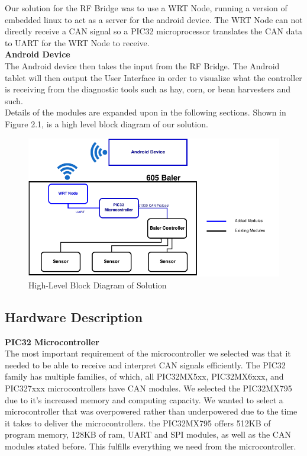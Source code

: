 \documentclass[paper=a4, fontsize=11pt]{scrartcl}
\numberwithin{equation}{section}		%
\numberwithin{figure}{section}			%
\numberwithin{table}{section}				%
\begin{document}
Our solution for the RF Bridge was to use a WRT Node, running a version of embedded linux to act as a server for the android device. The WRT Node can not directly receive a CAN signal so a PIC32 microprocessor translates the CAN data to UART for the WRT Node to receive. \\

\textbf{Android Device} \\
The Android device then takes the input from the RF Bridge. The Android tablet will then output the User Interface in order to visualize what the controller is receiving from the diagnostic tools such as hay, corn, or bean harvesters and such. \\

 Details of the modules are expanded upon in the following sections. Shown in Figure 2.1, is a high level block diagram of our solution.  \\
 \begin{figure}[ht]
	 \center\includegraphics[scale=0.36]{rev4.png}
 \caption{High-Level Block Diagram of Solution}
 \end{figure}

\subsection{Hardware Description}
\textbf{PIC32 Microcontroller}  \\
The most important requirement of the microcontroller we selected was that it needed to be able to receive and interpret CAN signals efficiently. The PIC32 family has multiple families, of which, all PIC32MX5xx, PIC32MX6xxx, and PIC327xxx microcontrollers have CAN modules. We selected the PIC32MX795 due to it's increased memory and computing capacity. We wanted to select a microcontroller that was overpowered rather than underpowered due to the time it takes to deliver the microcontrollers. the PIC32MX795 offers 512KB of program memory, 128KB of ram, UART and SPI modules, as well as the CAN modules stated before. This fulfills everything we need from the microcontroller. \\
\end{document}
